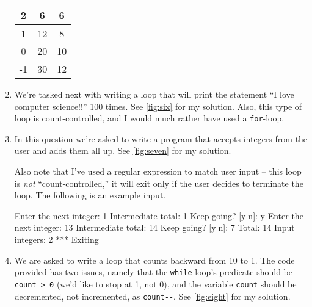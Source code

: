 \documentclass[leqno, 11pt]{article}
\begin{document}
\begin{enumerate}
\begin{center}
\begin{tabular}{|c|c|c|}
            \hline
             2 & 6  & 6  \\
            \hline
             1 & 12 & 8  \\
            \hline
             0 & 20 & 10 \\
            \hline
            -1 & 30 & 12 \\
            \hline
          \end{tabular}
        \end{center}
  \item We're tasked next with writing a loop that will print the statement ``I love computer science!!'' 100 times. See \autoref{fig:six} for my solution. Also, this type of loop is count-controlled, and I would much rather have used a \texttt{for}-loop.
  \item In this question we're asked to write a program that accepts integers from the user and adds them all up. See \autoref{fig:seven} for my solution.

        Also note that I've used a regular expression to match user input -- this loop is \textit{not} ``count-controlled,'' it will exit only if the user decides to terminate the loop. The following is an example input.
        \begin{verbbox}
Enter the next integer: 1
Intermediate total: 1
Keep going? [y|n]: y
Enter the next integer: 13
Intermediate total: 14
Keep going? [y|n]: 7
Total: 14
Input integers: 2
*** Exiting
        \end{verbbox}
        \begin{figure}[h!]
          \centering
          \theverbbox
        \end{figure}
      \item We are asked to write a loop that counts backward from 10 to 1. The code provided has two issues, namely that the \texttt{while}-loop's predicate should be \texttt{count > 0} (we'd like to stop at 1, not 0), and the variable \texttt{count} should be decremented, not incremented, as \verb|count--|. See \autoref{fig:eight} for my solution.
\end{enumerate}
\end{document}
